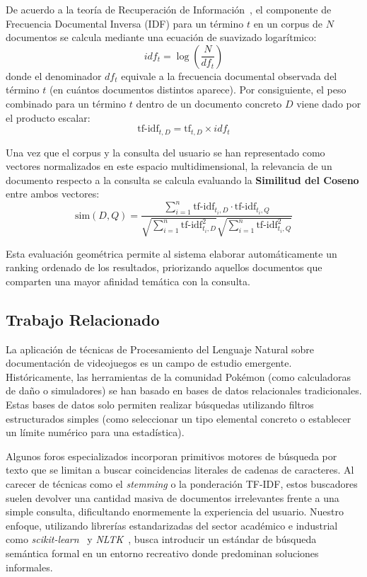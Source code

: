 \documentclass[conference,a4paper]{IEEEtran}
\begin{document}
De acuerdo a la teoría de Recuperación de Información~\cite{b8}, el componente de Frecuencia Documental Inversa (IDF) para un término $t$ en un corpus de $N$ documentos se calcula mediante una ecuación de suavizado logarítmico:
\begin{equation}
\label{eq:idf}
idf_{t} = \log\left(\frac{N}{df_{t}}\right)
\end{equation}
donde el denominador $df_{t}$ equivale a la frecuencia documental observada del término $t$ (en cuántos documentos distintos aparece). Por consiguiente, el peso combinado para un término $t$ dentro de un documento concreto $D$ viene dado por el producto escalar:
\begin{equation}
\label{eq:tfidf}
\text{tf-idf}_{t,D} = \text{tf}_{t,D} \times idf_{t}
\end{equation}

Una vez que el corpus y la consulta del usuario se han representado como vectores normalizados en este espacio multidimensional, la relevancia de un documento respecto a la consulta se calcula evaluando la \textbf{Similitud del Coseno} entre ambos vectores:
\begin{equation}
\label{eq:cosine}
\text{sim}(D, Q) = \frac{\sum_{i=1}^{n} \text{tf-idf}_{t_{i},D} \cdot \text{tf-idf}_{t_{i},Q}}{\sqrt{\sum_{i=1}^{n} \text{tf-idf}_{t_{i},D}^2} \sqrt{\sum_{i=1}^{n} \text{tf-idf}_{t_{i},Q}^2}}
\end{equation}

Esta evaluación geométrica permite al sistema elaborar automáticamente un ranking ordenado de los resultados, priorizando aquellos documentos que comparten una mayor afinidad temática con la consulta.

\subsection{Trabajo Relacionado}

La aplicación de técnicas de Procesamiento del Lenguaje Natural sobre documentación de videojuegos es un campo de estudio emergente. Históricamente, las herramientas de la comunidad Pokémon (como calculadoras de daño o simuladores) se han basado en bases de datos relacionales tradicionales. Estas bases de datos solo permiten realizar búsquedas utilizando filtros estructurados simples (como seleccionar un tipo elemental concreto o establecer un límite numérico para una estadística).

Algunos foros especializados incorporan primitivos motores de búsqueda por texto que se limitan a buscar coincidencias literales de cadenas de caracteres. Al carecer de técnicas como el \emph{stemming} o la ponderación TF-IDF, estos buscadores suelen devolver una cantidad masiva de documentos irrelevantes frente a una simple consulta, dificultando enormemente la experiencia del usuario. Nuestro enfoque, utilizando librerías estandarizadas del sector académico e industrial como \emph{scikit-learn}~\cite{b6} y \emph{NLTK}~\cite{b7}, busca introducir un estándar de búsqueda semántica formal en un entorno recreativo donde predominan soluciones informales.
\end{document}
